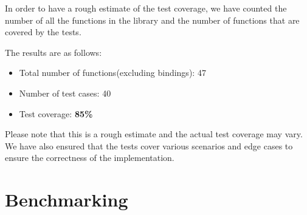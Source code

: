\documentclass[review]{AIM_report}
\begin{document}
In order to have a rough estimate of the test coverage, we have counted the number of all the functions in the library and the number of functions that are covered by the tests.

The results are as follows:
\begin{itemize}
    \item Total number of functions(excluding bindings): 47
    \item Number of test cases: 40
    \item Test coverage: \textbf{85\%}
\end{itemize}

Please note that this is a rough estimate and the actual test coverage may vary. We have also ensured that the tests cover various scenarios and edge cases to ensure the correctness of the implementation.

\newpage
\section{Benchmarking}
\newpage
\pagestyle{empty}



\newpage
\pagestyle{empty}



\newpage
\pagestyle{empty}


\end{document}
